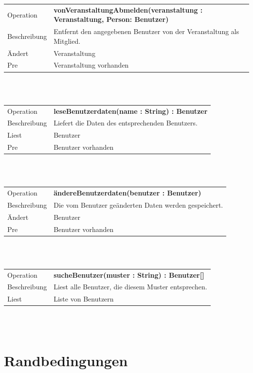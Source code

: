 \documentclass[12pt,a4paper]{article}
\begin{document}
{\begin{tabular}{|l|p{12cm}|}
	\hline
	Operation &  \textbf{vonVeranstaltungAbmelden(veranstaltung : Veranstaltung, Person: Benutzer)} \\ 
	Beschreibung &  Entfernt den angegebenen Benutzer von der Veranstaltung als Mitglied.\\ 
	Ändert & Veranstaltung \\ 
	Pre &  Veranstaltung vorhanden\\ 
	\hline 
\end{tabular}\\\\

\begin{tabular}{|l|p{12cm}|}
	\hline
	Operation &  \textbf{leseBenutzerdaten(name : String) : Benutzer} \\ 
	Beschreibung &  Liefert die Daten des entsprechenden Benutzers.\\ 
	Liest &  Benutzer\\ 
	Pre &  Benutzer vorhanden\\ 
	\hline 
\end{tabular}\\\\

\begin{tabular}{|l|p{12cm}|}
	\hline
	Operation &  \textbf{ändereBenutzerdaten(benutzer : Benutzer)} \\ 
	Beschreibung &  Die vom Benutzer geänderten Daten werden gespeichert.\\ 
	Ändert &  Benutzer\\ 
	Pre &  Benutzer vorhanden\\ 
	\hline 
\end{tabular}\\\\

\begin{tabular}{|l|p{12cm}|}
	\hline
	Operation &  \textbf{sucheBenutzer(muster : String) : Benutzer[] }\\ 
	Beschreibung &  Liest alle Benutzer, die diesem Muster entsprechen.\\ 
	Liest &  Liste von Benutzern\\ 
	\hline 
\end{tabular}\\\\

\section{Randbedingungen}

}
\end{document}
